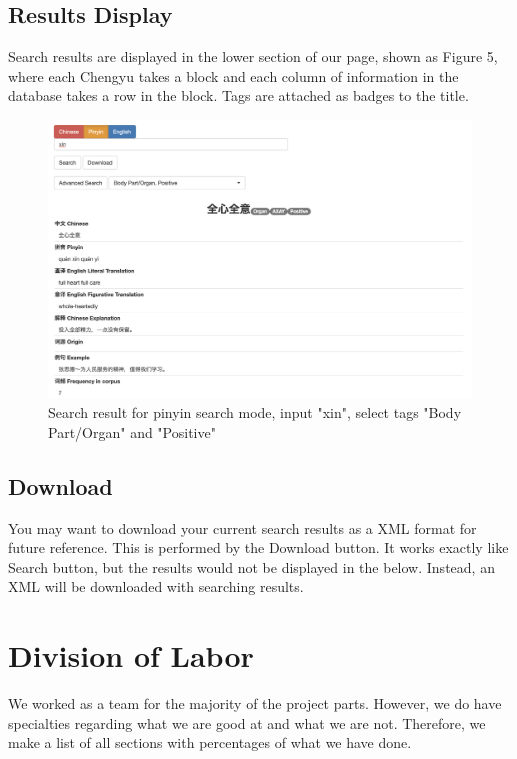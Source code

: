 \documentclass[11pt]{article} %
\begin{document}
\subsection{Results Display}

\indent Search results are displayed in the lower section of our page, shown as Figure 5, where each Chengyu takes a block and each column of information in the database takes a row in the block. Tags are attached as badges to the title.

\begin{figure}[htbp]
\begin{center}
\includegraphics[width=16cm]{result.png}
\caption{Search result for pinyin search mode, input "xin", select tags "Body Part/Organ" and "Positive"}
\label{default}
\end{center}
\end{figure}

\subsection{Download}
\indent You may want to download your current search results as a XML format for future reference. This is performed by the Download button. It works exactly like Search button, but the results would not be displayed in the below. Instead, an XML will be downloaded with searching results.

\section{Division of Labor}

\indent We worked as a team for the majority of the project parts. However, we do have specialties regarding what we are good at and what we are not. Therefore, we make a list of all sections with percentages of what we have done.
\end{document}
